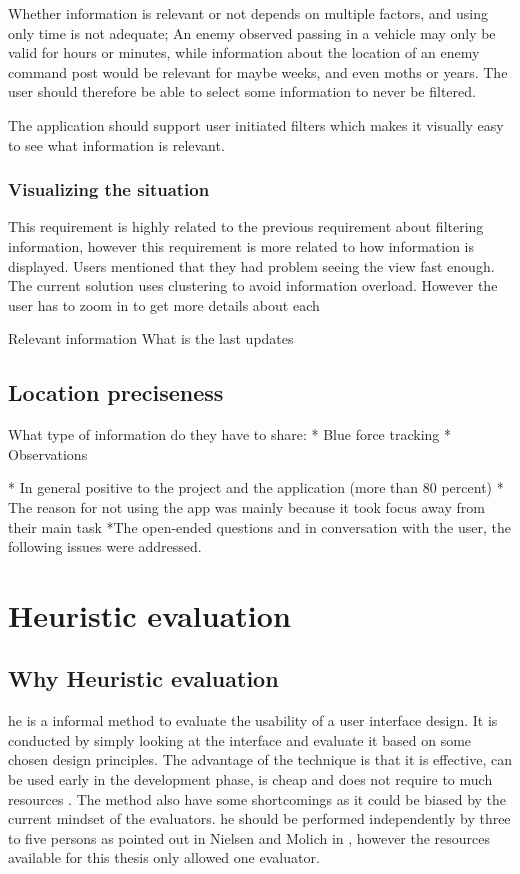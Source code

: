Whether information is relevant or not depends on multiple factors, and using only time is not adequate; An enemy observed passing in a vehicle may only be valid for hours or minutes, while information about the location of an enemy command post would be relevant for maybe weeks, and even moths or years. The user should therefore be able to select some information to never be filtered.  

\begin{requirement}
The application should support user initiated filters which makes it visually easy to see what information is relevant. 
\end{requirement}


\subsubsection{Visualizing the situation}
This requirement is highly related to the previous requirement about filtering information, however this requirement is more related to how information is displayed. Users mentioned that they had problem seeing the view fast enough. The current solution uses clustering to avoid information overload. However the user has to zoom in to get more details about each 


Relevant information
What is the last updates



\subsection{Location preciseness}

What type of information do they have to share:
* Blue force tracking
* Observations


* In general positive to the project and the application (more than 80 percent)
* The reason for not using the app was mainly because it took focus away from their main task
*The open-ended questions and in conversation with the user, the following issues were addressed. 


\section{Heuristic evaluation}
\subsection{Why Heuristic evaluation}
\gls{he} is a informal method to evaluate the usability of a user interface design. It is conducted by simply looking at the interface and evaluate it based on some chosen design principles\cite{he_nielsen}. The advantage of the technique is that it is effective, can be used early in the development phase, is cheap and does not require to much resources \cite{Nielsen_1992_HE_method}\cite{usability_mobile_bertini}. The method also have some shortcomings as it could be biased by the current mindset of the evaluators\cite{he_nielsen}. \gls{he} should be performed independently by three to five persons as pointed out in Nielsen and Molich in \cite{he_nielsen}, however the resources available for this thesis only allowed one evaluator. 

